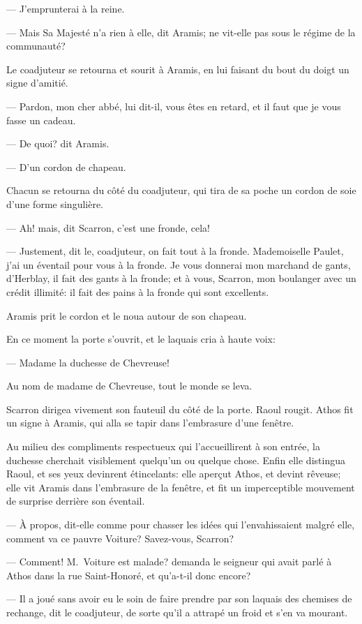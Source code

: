 — J'emprunterai à la reine.

— Mais Sa Majesté n'a rien à elle, dit Aramis; ne vit-elle pas sous le régime de la communauté?

Le coadjuteur se retourna et sourit à Aramis, en lui faisant du bout du doigt un signe d'amitié.

— Pardon, mon cher abbé, lui dit-il, vous êtes en retard, et il faut que je vous fasse un cadeau.

— De quoi? dit Aramis.

— D'un cordon de chapeau.

Chacun se retourna du côté du coadjuteur, qui tira de sa poche un cordon de soie d'une forme singulière.

— Ah! mais, dit Scarron, c'est une fronde, cela!

— Justement, dit le, coadjuteur, on fait tout à la fronde. Mademoiselle Paulet, j'ai un éventail pour vous à la fronde. Je vous donnerai mon marchand de gants, d'Herblay, il fait des gants à la fronde; et à vous, Scarron, mon boulanger avec un crédit illimité: il fait des pains à la fronde qui sont excellents.

Aramis prit le cordon et le noua autour de son chapeau.

En ce moment la porte s'ouvrit, et le laquais cria à haute voix:

— Madame la duchesse de Chevreuse!

Au nom de madame de Chevreuse, tout le monde se leva.

Scarron dirigea vivement son fauteuil du côté de la porte. Raoul rougit. Athos fit un signe à Aramis, qui alla se tapir dans l'embrasure d'une fenêtre.

Au milieu des compliments respectueux qui l'accueillirent à son entrée, la duchesse cherchait visiblement quelqu'un ou quelque chose. Enfin elle distingua Raoul, et ses yeux devinrent étincelants: elle aperçut Athos, et devint rêveuse; elle vit Aramis dans l'embrasure de la fenêtre, et fit un imperceptible mouvement de surprise derrière son éventail.

— À propos, dit-elle comme pour chasser les idées qui l'envahissaient malgré elle, comment va ce pauvre Voiture? Savez-vous, Scarron?

— Comment! M.~Voiture est malade? demanda le seigneur qui avait parlé à Athos dans la rue Saint-Honoré, et qu'a-t-il donc encore?

— Il a joué sans avoir eu le soin de faire prendre par son laquais des chemises de rechange, dit le coadjuteur, de sorte qu'il a attrapé un froid et s'en va mourant.


